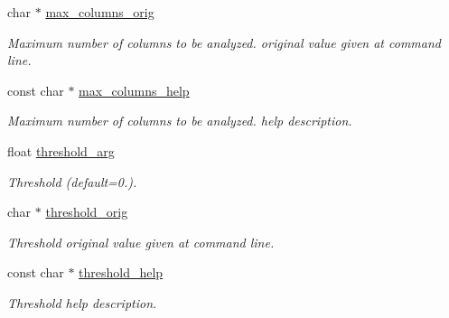\begin{DoxyCompactItemize}
char $\ast$ \hyperlink{structgengetopt__args__info_afd760be7f133c2ed4c49b882a02aaa01}{max\+\_\+columns\+\_\+orig}
\begin{DoxyCompactList}\small\item\em Maximum number of columns to be analyzed. original value given at command line. \end{DoxyCompactList}\item 
\mbox{\label{structgengetopt__args__info_aa7134849ab95be2bd3ab2ed1f3a7a7a9}} 
const char $\ast$ \hyperlink{structgengetopt__args__info_aa7134849ab95be2bd3ab2ed1f3a7a7a9}{max\+\_\+columns\+\_\+help}
\begin{DoxyCompactList}\small\item\em Maximum number of columns to be analyzed. help description. \end{DoxyCompactList}\item 
\mbox{\label{structgengetopt__args__info_a5eff603c526157103e7d17240bd6d77f}} 
float \hyperlink{structgengetopt__args__info_a5eff603c526157103e7d17240bd6d77f}{threshold\+\_\+arg}
\begin{DoxyCompactList}\small\item\em Threshold (default=\textquotesingle{}0.\textquotesingle{}). \end{DoxyCompactList}\item 
\mbox{\label{structgengetopt__args__info_a71ca71ffe7eaf2c8417258df79bd8b91}} 
char $\ast$ \hyperlink{structgengetopt__args__info_a71ca71ffe7eaf2c8417258df79bd8b91}{threshold\+\_\+orig}
\begin{DoxyCompactList}\small\item\em Threshold original value given at command line. \end{DoxyCompactList}\item 
\mbox{\label{structgengetopt__args__info_a3d9d6338802070db98f6cf1806f88869}} 
const char $\ast$ \hyperlink{structgengetopt__args__info_a3d9d6338802070db98f6cf1806f88869}{threshold\+\_\+help}
\begin{DoxyCompactList}\small\item\em Threshold help description. \end{DoxyCompactList}\item 
\mbox{\label{structgengetopt__args__info_ab9fd677f890731fd7d6f6c62e6dfc99c}} 

\end{DoxyCompactItemize}
